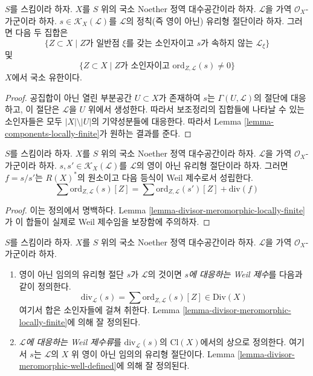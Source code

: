 \begin{lemma}
\label{lemma-divisor-meromorphic-locally-finite}
$S$를 스킴이라 하자. $X$를 $S$ 위의 국소 Noether 정역 대수공간이라
하자. $\mathcal{L}$을 가역 $\mathcal{O}_X$-가군이라 하자.
$s \in \mathcal{K}_X(\mathcal{L})$를 $\mathcal{L}$의 정칙(즉 영이 아닌)
유리형 절단이라 하자. 그러면 다음 두 집합은
$$
\{Z \subset X \mid Z \text{가 일반점 }\xi
\text{를 갖는 소인자이고 }s\text{가 속하지 않는 }\mathcal{L}_\xi\}
$$
및
$$
\{Z \subset X \mid Z \text{가 소인자이고 }
\text{ord}_{Z, \mathcal{L}}(s) \not = 0\}
$$
$X$에서 국소 유한이다.
\end{lemma}

\begin{proof}
공집합이 아닌 열린 부분공간 $U \subset X$가 존재하여 $s$는
$\Gamma(U, \mathcal{L})$의 절단에 대응하고, 이 절단은 $\mathcal{L}$을
$U$ 위에서 생성한다. 따라서 보조정리의 집합들에 나타날 수 있는
소인자들은 모두 $|X| \setminus |U|$의 기약성분들에 대응한다. 따라서
Lemma
\ref{lemma-components-locally-finite}가 원하는 결과를 준다.
\end{proof}

\begin{lemma}
\label{lemma-divisor-meromorphic-well-defined}
$S$를 스킴이라 하자.
$X$를 $S$ 위의 국소 Noether 정역 대수공간이라 하자. $\mathcal{L}$을
가역 $\mathcal{O}_X$-가군이라 하자. $s, s' \in
\mathcal{K}_X(\mathcal{L})$를 $\mathcal{L}$의 영이 아닌 유리형 절단이라
하자. 그러면 $f = s/s'$는 $R(X)^*$의 원소이고 다음 등식이 Weil
제수로서 성립한다.
$$
\sum \text{ord}_{Z, \mathcal{L}}(s)[Z]
=
\sum \text{ord}_{Z, \mathcal{L}}(s')[Z]
+
\text{div}(f)
$$
\end{lemma}

\begin{proof}
이는 정의에서 명백하다. Lemma
\ref{lemma-divisor-meromorphic-locally-finite}가 이 합들이 실제로 Weil
제수임을 보장함에 주의하자.
\end{proof}

\begin{definition}
\label{definition-divisor-invertible-sheaf}
$S$를 스킴이라 하자. $X$를 $S$ 위의 국소 Noether 정역 대수공간이라
하자. $\mathcal{L}$을 가역 $\mathcal{O}_X$-가군이라 하자.
\begin{enumerate}
\item 영이 아닌 임의의 유리형 절단 $s$가 $\mathcal{L}$의 것이면
{\it $s$에 대응하는 Weil 제수}를 다음과 같이 정의한다.
$$
\text{div}_\mathcal{L}(s) =
\sum \text{ord}_{Z, \mathcal{L}}(s) [Z] \in \text{Div}(X)
$$
여기서 합은 소인자들에 걸쳐 취한다. Lemma
\ref{lemma-divisor-meromorphic-locally-finite}에 의해 잘 정의된다.
\item {\it $\mathcal{L}$에 대응하는 Weil 제수류}를
$\text{div}_\mathcal{L}(s)$의 $\text{Cl}(X)$에서의 상으로 정의한다.
여기서 $s$는 $\mathcal{L}$의 $X$ 위 영이 아닌 임의의 유리형 절단이다.
Lemma \ref{lemma-divisor-meromorphic-well-defined}에 의해 잘 정의된다.
\end{enumerate}
\end{definition}

